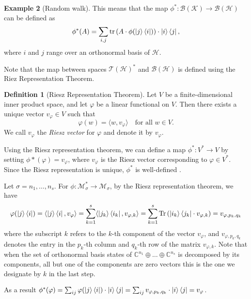 \documentclass[10pt,a4paper]{amsart}
\theoremstyle{definition}
\newtheorem{definition}{Definition}[section]
\theoremstyle{definition}
\newtheorem{example}[definition]{Example}
\theoremstyle{definition}
\theoremstyle{definition}
\theoremstyle{definition}
\theoremstyle{definition}
\begin{document}
\begin{example}[Random walk]
This means that the map $\phi^* : \mathcal{B}(\mathcal{K}) \to \mathcal{B}(\mathcal{H})$ can be defined as
\[
\phi^*(A) = \sum_{i,j} \operatorname{tr}\left(A \cdot \phi(\ket{j}\bra{i})\right) \cdot \ket{i}\bra{j},
\]
where \( i \) and \( j \) range over an orthonormal basis of \( \mathcal{H} \). 

Note that the map between spaces $\mathcal{T}(\mathcal{H})^*$ and $\mathcal{B}(\mathcal{H})$ is defined using the Riez Representation Theorem.

\begin{definition} [Riesz Representation Theorem]
Let $V$ be a finite-dimensional inner product space, and let $\varphi$ be a linear functional on $V$. Then there exists a unique vector $v_\varphi \in V$ such that
$$
\varphi(w) = \langle w, v_\varphi \rangle \quad \text{for all } w \in V.
$$
We call $v_\varphi$ the \emph{Riesz vector} for $\varphi$ and denote it by $v_\varphi$.\\
\end{definition}

Using the Riesz representation theorem, we can define a map 
$\phi^* : V^* \to V$
by setting \(\phi*(\varphi) = v_\varphi\), where \(v_\varphi\) is the Riesz vector corresponding to \(\varphi \in V^*\). Since the Riesz representation is unique, \(\phi^*\) is well-defined \cite{romanAdvancedLinearAlgebra1992}. 

Let $\sigma= n_1, \ldots, n_s$. For $\phi: \mathcal{M}_\sigma^* \to \mathcal{M}_\sigma $, by the Riesz representation theorem, we have
$$ \varphi(\ket{j} \bra{i})= \langle \ket{j} \bra{i},  v_\varphi  \rangle = \sum_{k=1}^s \langle \ket{j_k} \bra{i_k},  v_{\varphi,k}  \rangle = \sum_{k=1}^s  \text{Tr} \left( \ket{i_k} \bra{j_k} \cdot   v_{\varphi,k} \right) =  v_{\varphi,p_k,q_k} $$
where the subscript \(k\) refers to the \(k\)-th component of the vector \(v_\varphi\), and \(v_{\varphi, p_k, q_k}\) denotes the entry in the \(p_k\)-th column and \(q_k\)-th row of the matrix \(v_{\varphi,k}\). Note that when the set of orthonormal basis states of \(\mathbb{C}^{n_1} \oplus \ldots \oplus \mathbb{C}^{n_s}\) is decomposed by its components, all but one of the components are zero vectors this is the one we designate by $k$ in the last step.

As a result $\phi^*(\varphi) =  \sum_{ij} \varphi(\ket{j}\bra{i}) \cdot \ket{i} \bra{j} = \sum_{ij}  v_{\varphi,p_k,q_k} \cdot  \ket{i} \bra{j}  = v_{\varphi}$.








  \end{example}
  



\newpage
 

\end{document}
